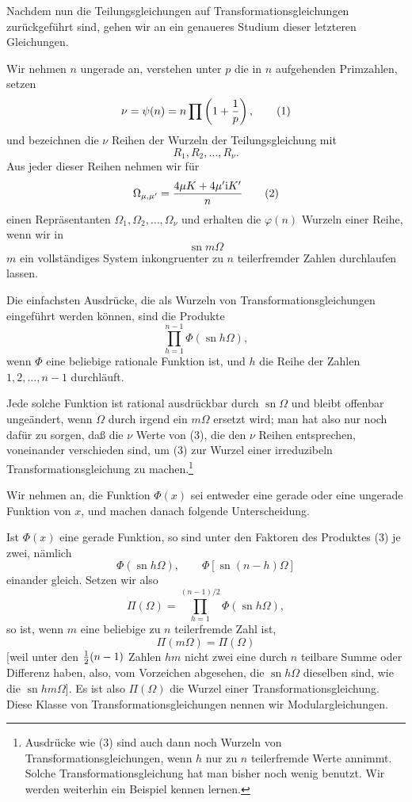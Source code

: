 \documentclass[11pt]{article}
\providecommand{\sn}{\operatorname{sn}}
\providecommand{\ii}{\mathrm{i}}
\begin{document}
Nachdem nun die Teilungsgleichungen auf Transformationsgleichungen zurückgeführt sind,
gehen wir an ein genaueres Studium dieser letzteren Gleichungen.

Wir nehmen $n$ ungerade an, verstehen unter $p$ die in $n$ aufgehenden Primzahlen, setzen
\begin{equation}
 \nu=\psi(n)=n\prod\left(1+{1\over p}\right),
\tag{1}
\end{equation}
und bezeichnen die $\nu$ Reihen der Wurzeln der Teilungsgleichung mit
\[
 R_1,R_2,\ldots,R_\nu.
\]
Aus jeder dieser Reihen nehmen wir für
\begin{equation}
 \Omega_{\mu,\mu'}={4\mu K+4\mu'\ii K'\over n}
\tag{2}
\end{equation}
einen Repräsentanten $\Omega_1,\Omega_2,\ldots,\Omega_\nu$ und erhalten die $\varphi(n)$
Wurzeln einer Reihe, wenn wir in
\[
 \sn m\Omega
\]
$m$ ein vollständiges System inkongruenter zu $n$ teilerfremder Zahlen durchlaufen lassen.

Die einfachsten Ausdrücke, die als Wurzeln von Transformationsgleichungen eingeführt
werden können, sind die Produkte
\begin{equation}
 \prod_{h=1}^{n-1}\Phi(\sn h\Omega),
\tag{3}
\end{equation}
wenn $\Phi$ eine beliebige rationale Funktion ist, und $h$ die Reihe der Zahlen
$1,2,\ldots,n-1$ durchläuft.

Jede solche Funktion ist rational ausdrückbar durch $\sn\Omega$ und bleibt offenbar
ungeändert, wenn $\Omega$ durch irgend ein $m\Omega$ ersetzt wird; man hat also nur noch
dafür zu sorgen, daß die $\nu$ Werte von (3), die den $\nu$ Reihen entsprechen, voneinander
verschieden sind, um (3) zur Wurzel einer irreduzibeln Transformationsgleichung zu
machen.\footnote{Ausdrücke wie (3) sind auch dann noch Wurzeln von Transformationsgleichungen, wenn $h$ nur zu $n$ teilerfremde Werte annimmt. Solche Transformationsgleichung hat man bisher noch wenig benutzt. Wir werden weiterhin ein Beispiel kennen lernen.}

Wir nehmen an, die Funktion $\Phi(x)$ sei entweder eine gerade oder eine ungerade
Funktion von $x$, und machen danach folgende Unterscheidung.

Ist $\Phi(x)$ eine gerade Funktion, so sind unter den Faktoren des Produktes (3) je zwei,
nämlich
\begin{equation}
 \Phi(\sn h\Omega),\qquad \Phi[\sn(n-h)\Omega]
\tag{4}
\end{equation}
einander gleich. Setzen wir also
\begin{equation}
 \Pi(\Omega)=\prod_{h=1}^{(n-1)/2}\Phi(\sn h\Omega),
\tag{5}
\end{equation}
so ist, wenn $m$ eine beliebige zu $n$ teilerfremde Zahl ist,
\begin{equation}
 \Pi(m\Omega)=\Pi(\Omega)
\tag{6}
\end{equation}
[weil unter den ${1\over2}(n-1)$ Zahlen $hm$ nicht zwei eine durch $n$ teilbare Summe oder
Differenz haben, also, vom Vorzeichen abgesehen, die $\sn h\Omega$ dieselben sind, wie die
$\sn hm\Omega$]. Es ist also $\Pi(\Omega)$ die Wurzel einer Transformationsgleichung. Diese
Klasse von Transformationsgleichungen nennen wir Modulargleichungen.
\end{document}
